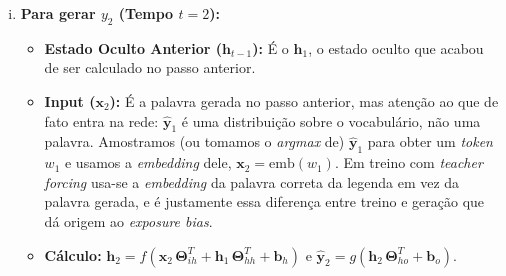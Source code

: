 \documentclass{dlproblemset}
\begin{document}
\begin{enumerate}[I)]
\begin{enumerate}[a)]
\begin{enumerate}[i.]
                            \item \textbf{Para gerar $y_2$ (Tempo $t=2$):}
                                \begin{itemize}
                                    \item \textbf{Estado Oculto Anterior ($\mathbf{h}_{t-1}$):} É o $\mathbf{h}_1$, o estado oculto que acabou de ser calculado no passo anterior.

                                    \item \textbf{Input ($\mathbf{x}_2$):} É a palavra gerada no passo anterior, mas atenção ao que de fato entra na rede: $\hat{\mathbf{y}}_1$ é uma distribuição sobre o vocabulário, não uma palavra. Amostramos (ou tomamos o \textit{argmax} de) $\hat{\mathbf{y}}_1$ para obter um \textit{token} $w_1$ e usamos a \textit{embedding} dele, $\mathbf{x}_2 = \text{emb}(w_1)$. Em treino com \textit{teacher forcing} usa-se a \textit{embedding} da palavra correta da legenda em vez da palavra gerada, e é justamente essa diferença entre treino e geração que dá origem ao \textit{exposure bias}.

                                    \item \textbf{Cálculo:} $\mathbf{h}_2 = f(\mathbf{x}_2\,\mathbf{\Theta}_{ih}^{T} + \mathbf{h}_1\,\mathbf{\Theta}_{hh}^{T} + \mathbf{b}_h)$ e $\hat{\mathbf{y}}_2 = g(\mathbf{h}_2\,\mathbf{\Theta}_{ho}^{T} + \mathbf{b}_o)$.
                                \end{itemize}
                        \end{enumerate}


\end{enumerate}
\end{enumerate}
\end{document}
